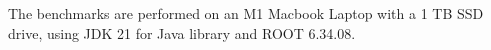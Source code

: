 
The benchmarks are performed on an M1 Macbook Laptop with a 1 TB SSD drive, using JDK 21 for Java library and ROOT 6.34.08.
